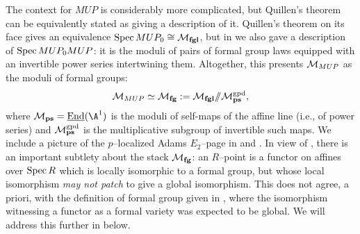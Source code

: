 \begin{example}\label{ContextOfMUPExample}
The context for $MUP$ is considerably more complicated, but Quillen's theorem can be equivalently stated as giving a description of it.  Quillen's theorem on its face gives an equivalence $\operatorname{Spec} MUP_0 \cong \mathcal{M}_{\mathbf{fgl}}$, but in  we also gave a description of $\operatorname{Spec} MUP_0 MUP$: it is the moduli of pairs of formal group laws equipped with an invertible power series intertwining them.  Altogether, this presents $\mathcal{M}_{MUP}$ as the moduli of formal groups: \[\mathcal{M}_{MUP} \simeq \mathcal{M}_{\mathbf{fg}} := \mathcal{M}_{\mathbf{fgl}} /\!\!/ \mathcal{M}_{\mathbf{ps}}^{\mathrm{gpd}},\] where $\moduli{ps} = \InternalEnd(\A^1)$ is the moduli of self-maps of the affine line (i.e., of power series) and $\mathcal{M}_{\mathbf{ps}}^{\mathrm{gpd}}$ is the multiplicative subgroup of invertible such maps.  We include a picture of the $p$--localized Adams $E_2$--page in  and .  In view of , there is an important subtlety about the stack $\mathcal{M}_{\mathbf{fg}}$: an $R$--point is a functor on affines over $\operatorname{Spec} R$ which is locally isomorphic to a formal group, but whose local isomorphism \emph{may not patch} to give a global isomorphism.  This does not agree, a priori, with the definition of formal group given in , where the isomorphism witnessing a functor as a formal variety was expected to be global.  We will address this further in  below.
\end{example}


